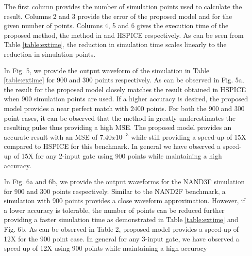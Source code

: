 The first column provides the number of simulation points used to calculate the result. Columns 2 and 3 provide the error of the proposed model and \cite{Accurate_Masking} for the given number of points. Columns 4, 5 and 6 gives the execution time of the proposed method, the method in \cite{Accurate_Masking} and HSPICE respectively. As can be seen from Table \ref{table:extime}, the reduction in simulation time scales linearly to the reduction in simulation points. 

In Fig. 5, we provide the output waveform of the simulation in Table \ref{table:extime} for 900 and 300 points respectively. As can be observed in Fig. 5a, the result for the proposed model closely matches the result obtained in HSPICE when 900 simulation points are used. If a higher accuracy is desired, the proposed model provides a near perfect match with 2400 points. For both the 900 and 300 point cases, it can be observed that the method in \cite{Accurate_Masking} greatly underestimates the resulting pulse thus providing a high MSE. The proposed model provides an accurate result with an MSE of $7.40x10^{-3}$ while still providing a speed-up of 15X compared to HSPICE for this benchmark. In general we have observed a speed-up of 15X for any 2-input gate using 900 points while maintaining a high accuracy.
  
In Fig. 6a and 6b, we provide the output waveforms for the NAND3F simulation for 900 and 300 points respectively. Similar to the NAND2F benchmark, a simulation with 900 points provides a close waveform approximation. However, if a lower accuracy is tolerable, the number of points can be reduced further providing a faster simulation time as demonstrated in Table \ref{table:extime} and Fig. 6b. As can be observed in Table 2, proposed model provides a speed-up of 12X for the 900 point case. In general for any 3-input gate, we have observed a speed-up of 12X using 900 points while maintaining a high accuracy

